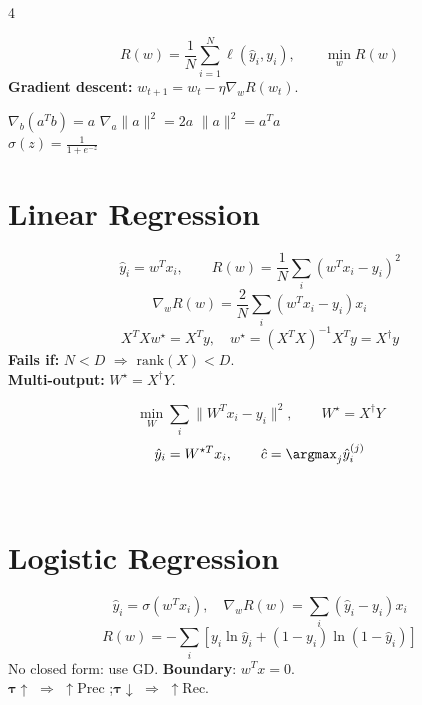 \documentclass[8pt,a4paper,landscape]{extarticle}
\begin{document}
\begin{multicols*}{4}


\begin{thm}[title=Core Empirical Risk]
\[
R(w)=\frac1N\sum_{i=1}^{N}\ell(\hat y_i,y_i),\qquad
\min_w R(w)
\]
\textbf{Gradient descent:} \(w_{t+1}=w_t-\eta\nabla_w R(w_t)\).
\end{thm}

\begin{thm}[title=Things to know]
  $\nabla_b(a^Tb)=a$ \quad $\nabla_a\|a\|^2=2a$ \quad $\|a\|^2=a^Ta$ \\ 
  $\sigma(z)=\frac1{1+e^{-z}}$
\end{thm}

\section{Linear Regression}
\begin{prop}[title=Model]
\[
\hat y_i=w^T x_i,\qquad
R(w)=\frac1N\sum_i(w^Tx_i-y_i)^2
\]
\[
\nabla_wR(w)=\frac2N\sum_i(w^Tx_i-y_i)x_i
\]
\[
X^TXw^\star=X^Ty,\quad
w^\star=(X^TX)^{-1}X^Ty = X^\dagger y
\]
\textbf{Fails if:} \(N<D\) \(\Rightarrow\) \(\mathrm{rank}(X)<D\).\\
\textbf{Multi-output:} \(W^\star=X^\dagger Y\).
\end{prop}

\begin{prop}[title=For classification]
\[
\min_W\sum_i\|W^Tx_i-y_i\|^2,\qquad
W^\star=X^\dagger Y
\]
\[
\hat y_i=W^{\star T}x_i,\qquad
\hat c=\argmax_j \hat y_i^{(j)}
\]
\end{prop}

\begin{defn}[title=Regression Metrics]
\quad{}\\
\quad{}
\end{defn}

\section{Logistic Regression}
\begin{prop}[title=Binary Model]
\[
\hat y_i=\sigma(w^Tx_i),\quad \nabla_wR(w)=\sum_i(\hat y_i-y_i)x_i
\]
\[
R(w)=-\sum_i\left[y_i\ln\hat y_i+(1-y_i)\ln(1-\hat y_i)\right]
\]
No closed form: use GD. \textbf{Boundary}: $w^Tx=0$.\\
$\boldsymbol{\tau\uparrow}$ $\Rightarrow$ $\uparrow$Prec ;\quad $\boldsymbol{\tau\downarrow}$ $\Rightarrow$ $\uparrow$Rec.
\end{prop}


\end{multicols*}
\end{document}
